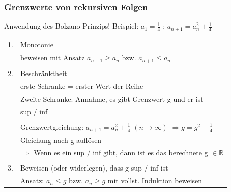 		\subsubsection{Grenzwerte von rekursiven Folgen}
			Anwendung des Bolzano-Prinzips!  Beispiel: $a_1 = \frac{1}{4}$ ; $a_{n+1} = a_n^2 + \frac{1}{4}$ \\
			
			\begin{tabular}{ll}
				1. & Monotonie \\
				   & beweisen mit Ansatz $a_{n+1} \geq a_n$ bzw. $a_{n+1} \leq a_n$ \\
				\\
				2. & Beschränktheit \\
				   & erste Schranke = erster Wert der Reihe \\
				   & Zweite Schranke: Annahme, es gibt Grenzwert g und er ist \\
				   & sup / inf \\
				\\
				   & Grenzwertgleichung: $a_{n+1} = a_n ^2 + \frac{1}{4}$  $(n \rightarrow \infty)$ $\Rightarrow g = g^2 + \frac{1}{4}$ \\
				   & Gleichung nach g auflösen \\
				   & $\Rightarrow$ Wenn es ein sup / inf gibt, dann ist es das berechnete g $\in \mathbb{R}$\\
				\\
				3. & Beweisen (oder widerlegen), dass g sup / inf ist \\
				   & Ansatz: $a_n \leq g$ bzw. $a_n \geq g$ mit vollst. Induktion beweisen \\
			\end{tabular}

	\vfill\null
	\pagebreak
